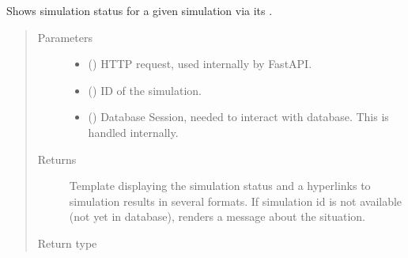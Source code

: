 \documentclass[a4paper,landscape,10pt,english]{sphinxmanual}
\begin{document}

\begin{fulllineitems}
\label{\detokenize{code_docs/simulation_API.controller:simulation_API.controller.main.simulate_status_sim_id}}
Shows simulation status for a given simulation via its .
\begin{quote}\begin{description}
\item[{Parameters}] \leavevmode\begin{itemize}
\item {} 
 () \textendash{} HTTP request, used internally by FastAPI.

\item {} 
 () \textendash{} ID of the simulation.

\item {} 
 () \textendash{} Database Session, needed to interact with database. This is handled
internally.

\end{itemize}

\item[{Returns}] \leavevmode
Template displaying the simulation status and a hyperlinks to
simulation results in several formats. If simulation id is not
available (not yet in database), renders a message about the situation.

\item[{Return type}] \leavevmode
{}

\end{description}\end{quote}

\end{fulllineitems}
\end{document}
